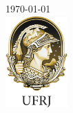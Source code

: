 \documentclass[12pt]{article}
\begin{document}
\begin{titlepage}
{\large \today}\\[2cm] %


\includegraphics[height=3.5cm]{logos/ufrj-logo.png}\\[1cm]


\vfill %

\end{titlepage}









%


%
\end{document}
